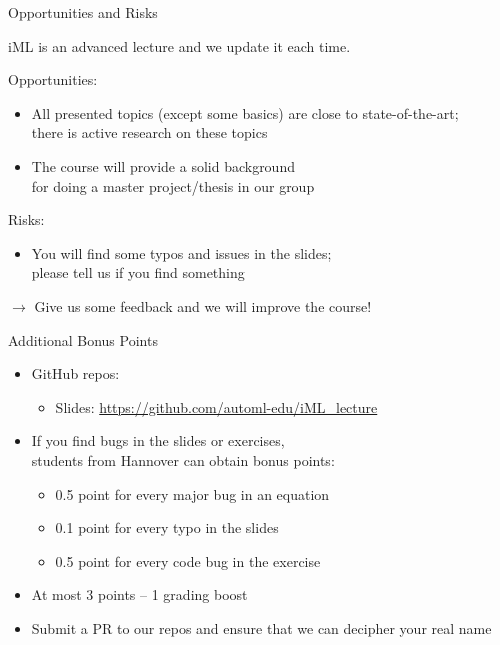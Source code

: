 \documentclass[aspectratio=169]{../latex_main/tntbeamer}  %
\begin{document}
\begin{frame}[c]{Opportunities and Risks}

iML is an advanced lecture and we update it each time.

\bigskip
\pause

Opportunities:
\begin{itemize}
  \item All presented topics (except some basics) are close to state-of-the-art;\\there is active research on these topics  
  \item The course will provide a solid background\\ for doing a master project/thesis in our group 
\end{itemize}

\medskip

Risks:
\begin{itemize}
  \item You will find some typos and issues in the slides;\\ please tell us if you find something
\end{itemize}

\medskip
$\to$ Give us some feedback and we will improve the course!


\end{frame}
\begin{frame}[c]{Additional Bonus Points}

\begin{itemize}
    \item GitHub repos:
    \begin{itemize}
        \item Slides: \url{https://github.com/automl-edu/iML_lecture}
    \end{itemize}
    \item If you find bugs in the slides or exercises,\\ students from Hannover can obtain bonus points:
    \begin{itemize}
        \item 0.5 point for every major bug in an equation
        \item 0.1 point for every typo in the slides
        \item 0.5 point for every code bug in the exercise
    \end{itemize}
    \item At most 3 points -- 1 grading boost
    \item Submit a PR to our repos and ensure that we can decipher your real name
\end{itemize}


\end{frame}
\end{document}
